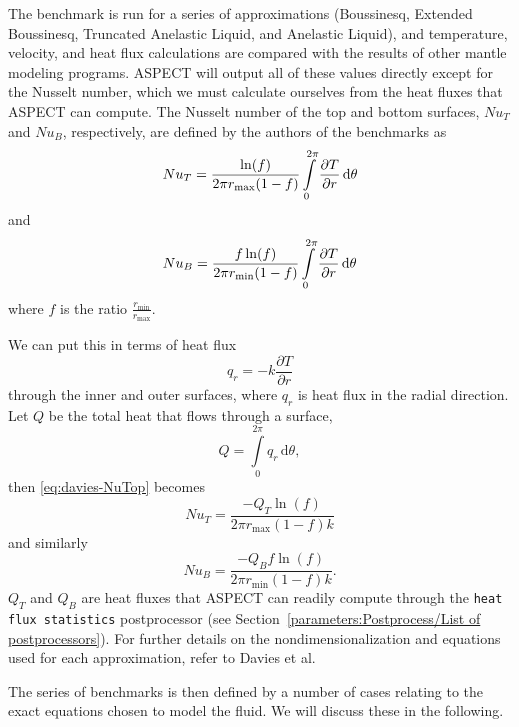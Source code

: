 \documentclass{article}
\newcommand{\aspect}{\textsc{ASPECT}}
\begin{document}
The benchmark is run for a series of approximations (Boussinesq, Extended Boussinesq,
Truncated Anelastic Liquid, and Anelastic Liquid), and temperature, velocity, and heat flux 
calculations are compared with the results of other mantle modeling programs. \aspect{}
will output all of these values directly except for the Nusselt number, which
we must calculate ourselves from the heat fluxes that \aspect{} can compute.
The Nusselt number of the top and bottom surfaces, ${Nu}_T$ and ${Nu}_B$,
respectively, are defined by the authors of the benchmarks as
\begin{equation}
\label{eq:davies-NuTop}
{Nu}_{T} = \frac{\ln(f)}{2{\pi}r_{\max}(1-f)}\int \limits_{0}^{2\pi} \frac{\partial T}{\partial r}\, \text{d}\theta  \\
\end{equation}
and
\begin{equation*}
\label{eq:davies-NuBottom}
{Nu}_{B} = \frac{f \ln(f)}{2{\pi}r_{\min}(1-f)}\int \limits_{0}^{2\pi} \frac{\partial T}{\partial r}\, \text{d}\theta \\
\end{equation*}
where $f$ is the ratio $\frac{r_{\min}}{r_{\max}}$.

We can put this in terms of heat flux
\begin{equation*}
  q_r = -k\frac{\partial T}{\partial r}
\end{equation*}
through the inner and outer surfaces,
where $q_r$ is heat flux in the radial direction. Let $Q$ be the total heat that flows through a surface,
\begin{equation*}
  Q = \int \limits_{0}^{2\pi} q_r\, \text{d}\theta,
\end{equation*}
then \eqref{eq:davies-NuTop} becomes
\begin{equation*}
  {Nu}_{T} = \frac{-Q_{T}\ln(f)}{2\pi{r_{\max}}(1-f)k}
\end{equation*}
and similarly
\begin{equation*}
  {Nu}_{B} = \frac{-Q_{B}f\ln(f)}{2\pi{r_{\min}}(1-f)k}.
\end{equation*} 
$Q_T$ and $Q_B$ are heat fluxes that \aspect{} can readily compute through the
\texttt{heat flux statistics} postprocessor (see
Section~\ref{parameters:Postprocess/List of postprocessors}).
For further details on the nondimensionalization and equations used for each
approximation, refer to Davies et al.

The series of benchmarks is then defined by a number of cases relating to the
exact equations chosen to model the fluid. We will discuss these in the
following.
\end{document}
